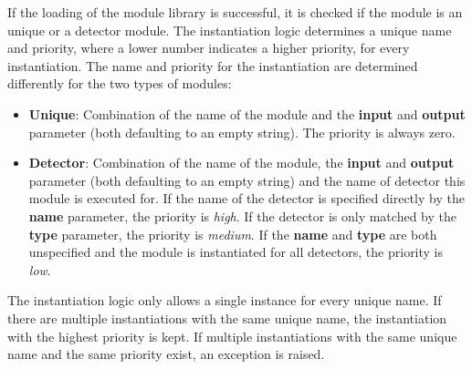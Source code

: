 If the loading of the module library is successful, it is checked if the module is an unique or a detector module.
The instantiation logic determines a unique name and priority, where a lower number indicates a higher priority, for every instantiation.
The name and priority for the instantiation are determined differently for the two types of modules:
\begin{itemize}
\item \textbf{Unique}: Combination of the name of the module and the \textbf{input} and \textbf{output} parameter (both defaulting to an empty string).
The priority is always zero.
\item \textbf{Detector}: Combination of the name of the module, the \textbf{input} and \textbf{output} parameter (both defaulting to an empty string) and the name of detector this module is executed for.
If the name of the detector is specified directly by the \textbf{name} parameter, the priority is \emph{high}.
If the detector is only matched by the \textbf{type} parameter, the priority is \emph{medium}.
If the \textbf{name} and \textbf{type} are both unspecified and the module is instantiated for all detectors, the priority is \emph{low}.
\end{itemize}
The instantiation logic only allows a single instance for every unique name.
If there are multiple instantiations with the same unique name, the instantiation with the highest priority is kept.
If multiple instantiations with the same unique name and the same priority exist, an exception is raised.

